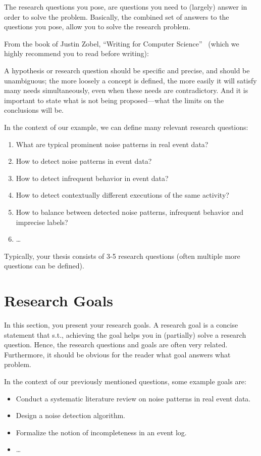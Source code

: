 The research questions you pose, are questions you need to (largely) answer in order to solve the problem.
Basically, the combined set of answers to the questions you pose, allow you to solve the research problem.

From the book of Justin Zobel, \enquote{Writing for Computer Science}~\autocite{DBLP:books/sp/Zobel14} (which we highly recommend you to read before writing):

\begin{displayquote}
	A hypothesis or research question should be specific and precise, and should be
	unambiguous; the more loosely a concept is defined, the more easily it will satisfy
	many needs simultaneously, even when these needs are contradictory. And it is
	important to state what is not being proposed—what the limits on the conclusions
	will be.
\end{displayquote}

In the context of our example, we can define many relevant research questions:
\begin{enumerate}
	\item What are typical prominent noise patterns in real event data?
	\item How to detect noise patterns in event data?
	\item How to detect infrequent behavior in event data?
	\item How to detect contextually different executions of the same activity?
	\item How to balance between detected noise patterns, infrequent behavior and imprecise labels?
	\item \dots
\end{enumerate}
Typically, your thesis consists of 3-5 research questions (often multiple more questions can be defined).

\section{Research Goals}

In this section, you present your research goals.
A research goal is a concise statement that s.t., achieving the goal helps you in (partially) solve a research question.
Hence, the research questions and goals are often very related.
Furthermore, it should be obvious for the reader what goal answers what problem.

In the context of our previously mentioned questions, some example goals are:
\begin{itemize}
	\item Conduct a systematic literature review on noise patterns in real event data.
	\item Design a noise detection algorithm.
	\item Formalize the notion of incompleteness in an event log.
	\item \dots
\end{itemize}

